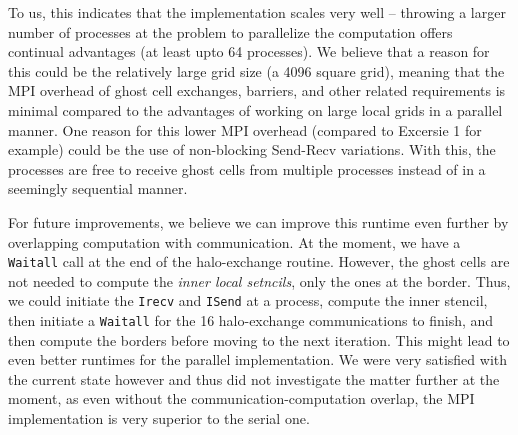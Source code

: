 \documentclass[a4paper,10pt]{article}
\begin{document}
To us, this indicates that the implementation scales very well -- throwing a larger number of processes at the problem to parallelize the computation offers continual advantages (at least upto 64 processes). We believe that a reason for this could be the relatively large grid size (a 4096 square grid), meaning that the MPI overhead of ghost cell exchanges, barriers, and other related requirements is minimal compared to the advantages of working on large local grids in a parallel manner. One reason for this lower MPI overhead (compared to Excersie 1 for example) could be the use of non-blocking Send-Recv variations. With this, the processes are free to receive ghost cells from multiple processes instead of in a seemingly sequential manner. 

For future improvements, we believe we can improve this runtime even further by overlapping computation with communication. At the moment, we have a \verb|Waitall| call at the end of the halo-exchange routine. However, the ghost cells are not needed to compute the \textit{inner local setncils}, only the ones at the border. Thus, we could initiate the \verb|Irecv| and \verb|ISend| at a process, compute the inner stencil, then initiate a \verb|Waitall| for the 16 halo-exchange communications to finish, and then compute the borders before moving to the next iteration. This might lead to even better runtimes for the parallel implementation. We were very satisfied with the current state however and thus did not investigate the matter further at the moment, as even without the communication-computation overlap, the MPI implementation is very superior to the serial one. 



\end{document}
